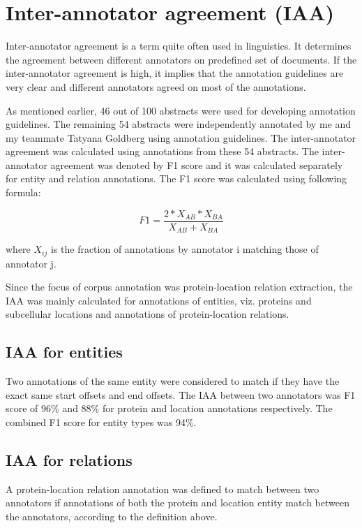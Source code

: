 \section{Inter-annotator agreement (IAA)}

Inter-annotator agreement is a term quite often used in linguistics. It determines the agreement between different annotators on predefined set of documents. If the inter-annotator agreement is high, it implies that the annotation guidelines are very clear and different annotators agreed on most of the annotations.

As mentioned earlier, 46 out of 100 abstracts were used for developing annotation guidelines. The remaining 54 abstracts were independently annotated by me and my teammate Tatyana Goldberg using annotation guidelines. The inter-annotator agreement was calculated using annotations from these 54 abstracts. The inter-annotator agreement was denoted by F1 score and it was calculated separately for entity and relation annotations. The F1 score was calculated using following formula:

$$
F1 = \frac{2*X_{AB}*X_{BA}}{X_{AB}+X_{BA}}
$$

where $X_{ij}$ is the fraction of annotations by annotator i matching those of annotator j.

Since the focus of corpus annotation was protein-location relation extraction, the IAA was mainly calculated for annotations of entities, viz. proteins and subcellular locations and annotations of protein-location relations.

\subsection*{IAA for entities}

Two annotations of the same entity were considered to match if they have the exact same start offsets and end offsets. The IAA between two annotators was F1 score of  96\% and 88\% for protein and location annotations respectively. The combined F1 score for entity types was 94\%.

\subsection*{IAA for relations}

A protein-location relation annotation was defined to match between two annotators if annotations of both the protein and location entity match between the annotators, according to the definition above.

